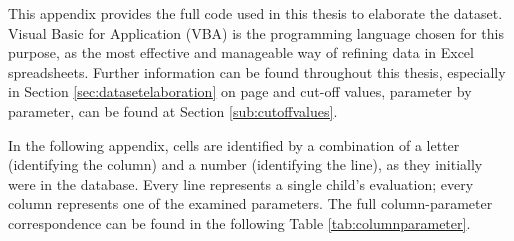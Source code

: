 \label{chap:appendixvbaexpressions}
This appendix provides the full code used in this thesis to elaborate the dataset. Visual Basic for Application (VBA) is the programming language chosen for this purpose, as the most effective and manageable way of refining data in Excel spreadsheets. Further information can be found throughout this thesis, especially in Section \ref{sec:datasetelaboration} on page \pageref{sec:datasetelaboration} and cut-off values, parameter by parameter, can be found at Section \ref{sub:cutoffvalues}.

In the following appendix, cells are identified by a combination of a letter (identifying the column) and a number (identifying the line), as they initially were in the database. Every line represents a single child's evaluation; every column represents one of the examined parameters. The full column-parameter correspondence can be found in the following Table \ref{tab:columnparameter}.

\newpage


